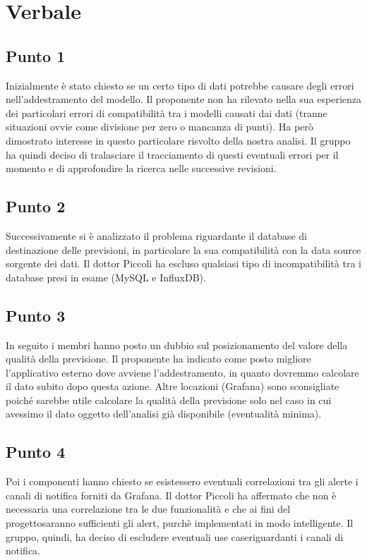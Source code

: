 \section{Verbale}
    \subsection{Punto 1}
        Inizialmente è stato chiesto se un certo tipo di dati potrebbe causare degli errori nell'addestramento del modello. Il proponente non ha rilevato nella sua esperienza dei particolari errori di compatibilità tra i modelli causati dai dati (tranne situazioni ovvie come divisione per zero o mancanza di punti). Ha però dimostrato interesse in questo particolare risvolto della nostra analisi. Il gruppo ha quindi deciso di tralasciare il tracciamento di questi eventuali errori per il momento e di approfondire la ricerca nelle successive revisioni.
    \subsection{Punto 2}
        Successivamente si è analizzato il problema riguardante il database di destinazione delle previsioni, in particolare la sua compatibilità con la data source sorgente dei dati. Il dottor Piccoli ha escluso qualsiasi tipo di incompatibilità tra i database presi in esame (MySQL e InfluxDB). 
    \subsection{Punto 3}
        In seguito i membri hanno posto un dubbio sul posizionamento del valore della qualità della previsione. Il proponente ha indicato come posto migliore l'applicativo esterno dove avviene l'addestramento, in quanto dovremmo calcolare il dato subito dopo questa azione. Altre locazioni (Grafana\glo) sono sconsigliate poiché sarebbe utile calcolare la qualità della previsione solo nel caso in cui avessimo il dato oggetto dell'analisi già disponibile (eventualità minima).
    \subsection{Punto 4}
        Poi i componenti hanno chiesto se esistessero eventuali correlazioni tra gli alert\glosp e i canali di notifica forniti da Grafana\glo. Il dottor Piccoli ha affermato che non è necessaria una correlazione tra le due funzionalità e che ai fini del progetto\glosp saranno sufficienti gli alert\glo, purchè implementati in modo intelligente. Il gruppo, quindi, ha deciso di escludere eventuali use case\glosp riguardanti i canali di notifica.
